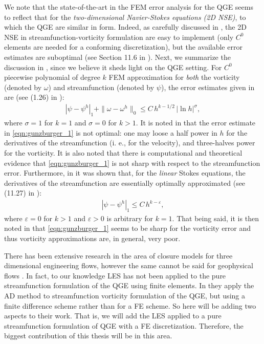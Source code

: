 We note that the state-of-the-art in the FEM error analysis for the QGE seems to reflect that for
the \emph{two-dimensional Navier-Stokes equations (2D NSE)}, to which the QGE are similar in form.
Indeed, as carefully discussed in \cite{Gunzburger89}, the 2D NSE in streamfunction-vorticity
formulation are easy to implement (only $C^0$ elements are needed for a conforming discretization),
but the available error estimates are suboptimal (see Section 11.6 in \cite{Gunzburger89}). Next,
we summarize the discussion in \cite{Gunzburger89}, since we believe it sheds light on the QGE
setting. For $C^0$ piecewise polynomial of degree $k$ FEM approximation for \emph{both} the
vorticity (denoted by $\omega$) and streamfunction (denoted by $\psi$), the error estimates given in
\cite{Girault86} are (see (1.26) in \cite{Gunzburger89}):
\begin{eqnarray}
  | \psi - \psi^h |_1 + \| \omega - \omega^h \|_0 \leq C \, h^{k - 1/2} \, | \ln h |^{\sigma} ,
  \label{eqn:gunzburger_1}
\end{eqnarray}
where $\sigma = 1$ for $k = 1$ and $\sigma = 0$ for $k > 1$. It is noted in \cite{Gunzburger89}
that the error estimate in \eqref{eqn:gunzburger_1} is not optimal: one may loose a half power in
$h$ for the derivatives of the streamfunction (i. e., for the velocity), and three-halves power for
the vorticity. It is also noted that there is computational and theoretical evidence that
\eqref{eqn:gunzburger_1} is not sharp with respect to the streamfunction error. Furthermore, in
\cite{Fix84} it was shown that, for the \emph{linear} Stokes equations, the derivatives of the
streamfunction are essentially optimally approximated (see (11.27) in \cite{Gunzburger89}):
\begin{eqnarray}
  | \psi - \psi^h |_1 \leq C \, h^{k - \varepsilon} , \label{eqn:gunzburger_2}
\end{eqnarray}
where $\varepsilon = 0$ for $k > 1$ and $\varepsilon > 0$ is arbitrary for $k = 1$. That being
said, it is then noted in \cite{Gunzburger89} that  \eqref{eqn:gunzburger_1} seems to be sharp for
the vorticity error and thus vorticity approximations are, in general, very poor.

There has been extensive research in the area of closure models for three
dimensional engineering flows, however the same cannot be said for geophysical flows
\cite{Berselli06, San11}. In fact, to our knowledge LES has not been applied to the pure
streamfunction formulation of the QGE using finite elements. In \cite{San11} they apply the AD
method to streamfunction vorticity formulation of the QGE, but using a finite difference scheme
rather than for a FE scheme. So here will be adding two aspects to their work. That is, we will add
the LES applied to a pure streamfunction formulation of QGE with a FE discretization. Therefore, the
biggest contribution of this thesis will be in this area. 
